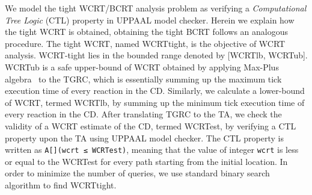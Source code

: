We model the tight WCRT/BCRT analysis problem as verifying a
\textit{Computational Tree Logic} (CTL) property in UPPAAL model
checker. Herein we explain how the tight WCRT is obtained, obtaining the
tight BCRT follows an analogous procedure. The tight WCRT, named
WCRTtight, is the objective of WCRT analysis. WCRT-tight lies in the
bounded range denoted by [WCRTlb, WCRTub]. WCRTub is a safe upper-bound
of WCRT obtained by applying Max-Plus algebra~\cite{boldt07} to the
TGRC, which is essentially summing up the maximum tick execution time of
every reaction in the CD. Similarly, we calculate a lower-bound of WCRT,
termed WCRTlb, by summing up the minimum tick execution time of every
reaction in the CD. After translating TGRC to the TA, we check the
validity of a WCRT estimate of the CD, termed WCRTest, by verifying a
CTL property upon the TA using UPPAAL model checker. The CTL property is
written as \texttt{A[](wcrt ≤ WCRTest)}, meaning that the value of
integer \texttt{wcrt} is less or equal to the WCRTest for every path
starting from the initial location. In order to minimize the number of
queries, we use standard binary search algorithm to find WCRTtight.




